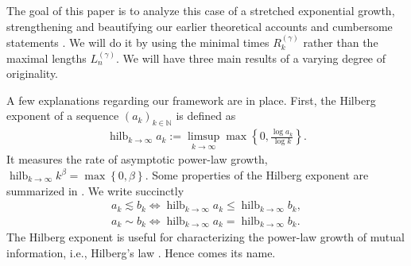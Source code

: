 \documentclass[a4paper,12pt]{article}
\newcommand{\klam}[1]{\left\{ #1 \right\}}
\DeclareMathOperator*{\hilberg}{hilb}
\begin{document}
The goal of this paper is to analyze this case of a stretched
exponential growth, strengthening and beautifying our earlier
theoretical accounts and cumbersome statements
\citep{Debowski15f,Debowski18b,Debowski21}. We will do it by using the
minimal times $R^{(\gamma)}_k$ rather than the maximal lengths
$L^{(\gamma)}_n$. We will have three main results of a varying degree
of originality.

A few explanations regarding our framework are in place.  First, the
Hilberg exponent of a sequence $(a_k)_{k\in\mathbb{N}}$ is defined as
\begin{align}
  \label{Exponent}
  \hilberg_{k\rightarrow\infty} a_k
  :=\limsup_{k\rightarrow\infty} \max\klam{0,\frac{\log
  a_k}{\log k}}
  .
\end{align}
It measures the rate of asymptotic power-law growth,
$\hilberg_{k\rightarrow\infty} k^\beta=\max\klam{0,\beta}$. Some
properties of the Hilberg exponent are summarized in \citep[Section
8.1]{Debowski21}. We write succinctly
\begin{align}
  a_k\lesssim b_k\iff
  \hilberg_{k\rightarrow\infty} a_k\le
  \hilberg_{k\rightarrow\infty} b_k,
  \\
  a_k\sim b_k\iff
  \hilberg_{k\rightarrow\infty} a_k=
  \hilberg_{k\rightarrow\infty} b_k.
\end{align}
The Hilberg exponent is useful for characterizing the power-law growth
of mutual information, i.e., Hilberg's law \citep[Chapter
8]{Debowski21}. Hence comes its name.
\end{document}

